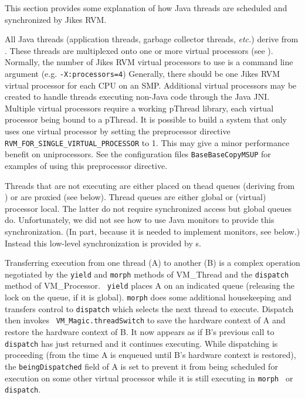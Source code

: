 This section provides some explanation of how Java\TMweb{} threads are
scheduled and synchronized by Jikes\TMweb{} RVM.


All Java threads (application threads, garbage collector threads, {\em
etc.})  derive from 
.  
These threads are multiplexed onto
one or more virtual processors (see 
).  Normally, the
number of Jikes RVM virtual processors to use is a command line argument
(e.g. {\tt -X:processors=4}) Generally, there should be one Jikes RVM
virtual processor for each CPU on an SMP.  Additional virtual
processors may be created to handle threads executing non-Java code
through the Java JNI.  Multiple virtual processors require a working
pThread library, each virtual processor being bound to a pThread.  It
is possible to build a system that only uses one virtual processor by
setting the preprocessor directive {\tt
RVM\_FOR\_SINGLE\_VIRTUAL\_PROCESSOR} to 1.  This may give a minor
performance benefit on uniprocessors. See the configuration files
{\tt BaseBaseCopyMSUP} for examples of
using this preprocessor directive.

Threads that are not executing are either placed on thead queues
(deriving from 
) or are proxied (see below).
Thread queues are either global or (virtual) processor local.  The
latter do not require synchronized access but global queues do.
Unfortunately, we did not see how to use Java monitors to provide
this synchronization.  (In part, because it is needed to implement
monitors, see below.)  Instead this low-level synchronization is
provided by 
s.

Transferring execution from one thread (A) to another (B) is a complex
operation negotiated by the {\tt yield} and {\tt morph} methods of
VM\_Thread and the {\tt dispatch} method of VM\_Processor.  {\tt
yield} places A on an indicated queue (releasing the lock on the
queue, if it is global).  {\tt morph} does some additional
housekeeping and transfers control to {\tt dispatch} which selects the
next thread to execute. Dispatch then invokes {\tt
VM\_Ma\-gic.thread\-Switch} to save the hardware context of A and restore
the hardware context of B.  It now appears as if B's previous call to
{\tt dispatch} has just returned and it continues executing. While
dispatching is proceeding (from the time A is enqueued until B's
hardware context is restored), the {\tt be\-ing\-Dis\-patched} field of A is
set to prevent it from being scheduled for execution on some other
virtual processor while it is still executing in {\tt morph } or {\tt
dispatch}. 

